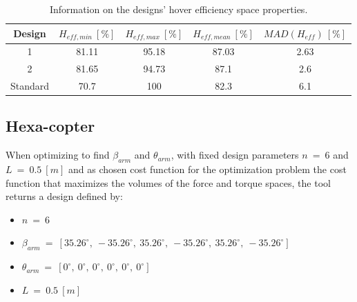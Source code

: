 \begin{table}[!ht]
\begin{center}
 \caption{Information on the designs’ torque space properties.}\vspace{1ex}
 \label{tab:tab_Quad_compare_torque}
\end{center}
\end{table}

\begin{table}[!ht]
\begin{center}
 \caption{Information on the designs’ hover efficiency space properties.}\vspace{1ex}
 \label{tab:tab_Quad_compare_hover}
 {\scriptsize\begin{tabular}{|c|cccc|}
 \hline
  Design & $H_{eff,min}\ [\%]$ & $H_{eff,max}\ [\%]$ & $H_{eff,mean}\ [\%]$
  & $MAD(H_{eff})\ [\%]$\\ \hline
  1 & 81.11 & 95.18 & 87.03 & 2.63\\
  2 & 81.65 & 94.73 & 87.1 & 2.6\\
  Standard & 70.7 & 100 & 82.3 & 6.1\\
 \hline
\end{tabular}}
\end{center}
\end{table}

\subsection{Hexa-copter}
\label{sec:hexa_copter}

When optimizing to find $\beta_{arm}$ and $\theta_{arm}$, with fixed
design parameters $n\ =\ 6$ and $L\ =\ 0.5\ [m]$ and as chosen cost function
for the optimization problem the cost function that maximizes the volumes
of the force and torque spaces, the tool returns a design defined by:

{\scriptsize\begin{itemize}
  \item $n\ =\ 6$
  \item $\beta_{arm}\ =\ [35.26^{\circ},\  -35.26^{\circ},\  35.26^{\circ},\  -35.26^{\circ},\
                          35.26^{\circ},\  -35.26^{\circ}]$
  \item $\theta_{arm}\ =\ [0^{\circ},\  0^{\circ},\  0^{\circ},\  0^{\circ},\ 0^{\circ},\  0^{\circ}]$
  \item $L\ =\ 0.5\ [m]$
\end{itemize}}

